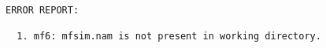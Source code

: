 {\small
\begin{lstlisting}[style=modeloutput]

ERROR REPORT:

  1. mf6: mfsim.nam is not present in working directory.
\end{lstlisting}
}
